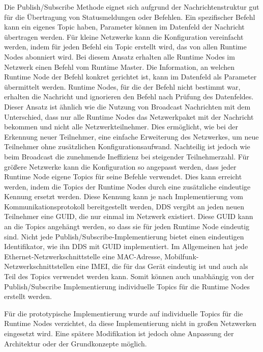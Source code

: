 Die Publish/Subscribe Methode eignet sich aufgrund der Nachrichtenstruktur gut für die Übertragung von Statusmeldungen oder Befehlen. Ein spezifischer Befehl kann ein eigenes Topic haben, Parameter können im Datenfeld der Nachricht übertragen werden. Für kleine Netzwerke kann die Konfiguration vereinfacht werden, indem für jeden Befehl ein Topic erstellt wird, das von allen Runtime Nodes abonniert wird. Bei diesem Ansatz erhalten alle Runtime Nodes im Netzwerk einen Befehl vom Runtime Master. Die Information, an welchen Runtime Node der Befehl konkret gerichtet ist, kann im Datenfeld als Parameter übermittelt werden. Runtime Nodes, für die der Befehl nicht bestimmt war, erhalten die Nachricht und ignorieren den Befehl nach Prüfung des Datenfeldes. Dieser Ansatz ist ähnlich wie die Nutzung von Broadcast Nachrichten mit dem Unterschied, dass nur alle Runtime Nodes das Netzwerkpaket mit der Nachricht bekommen und nicht alle Netzwerkteilnehmer. Dies ermöglicht, wie bei der Erkennung neuer Teilnehmer, eine einfache Erweiterung des Netzwerkes, um neue Teilnehmer ohne zusätzlichen Konfigurationsaufwand. Nachteilig ist jedoch wie beim Broadcast die zunehmende Ineffizienz bei steigender Teilnehmerzahl. Für größere Netzwerke kann die Konfiguration so angepasst werden, dass jeder Runtime Node eigene Topics für seine Befehle verwendet. Dies kann erreicht werden, indem die Topics der Runtime Nodes durch eine zusätzliche eindeutige Kennung ersetzt werden. Diese Kennung kann je nach Implementierung vom Kommunikationsprotokoll bereitgestellt werden, \gls{DDS} vergibt an jeden neuen Teilnehmer eine \gls{GUID}, die nur einmal im Netzwerk existiert. Diese GUID kann an die Topics angehängt werden, so dass sie für jeden Runtime Node eindeutig sind. Nicht jede Publish/Subscribe-Implementierung bietet einen eindeutigen Identifikator, wie ihn \gls{DDS} mit \gls{GUID} implementiert. Im Allgemeinen hat jede Ethernet-Netzwerkschnittstelle eine \gls{MAC}-Adresse, Mobilfunk-Netzwerkschnittstellen eine \gls{IMEI}, die für das Gerät eindeutig ist und auch als Teil des Topics verwendet werden kann. Somit können auch unabhängig von der Publish/Subscribe Implementierung individuelle Topics für die Runtime Nodes erstellt werden. 

Für die prototypische Implementierung wurde auf individuelle Topics für die Runtime Nodes verzichtet, da diese Implementierung nicht in großen Netzwerken eingesetzt wird. Eine spätere Modifikation ist jedoch ohne Anpassung der Architektur oder der Grundkonzepte möglich. 

